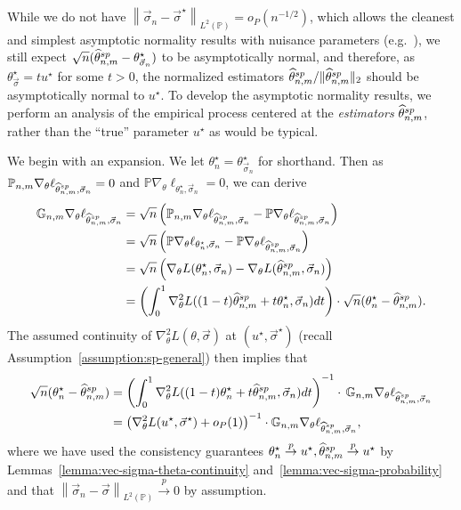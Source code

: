 \documentclass[11pt]{article}
\newcommand{\Prb}{\mathbb{P}}
\renewcommand{\P}{\mathbb{P}}
\newcommand{\prn}[1]{\left({#1}\right)} %
\newcommand{\norm}[1]{\left\|{#1}\right\|} %
\newcommand{\what}[1]{\widehat{#1}}
\newcommand{\sem}{^{\textup{sp}}}
\newcommand{\loss}{\ell}
\newcommand{\poploss}{L}
\newcommand{\norms}[1]{\|{#1}\|} %
\newcommand{\ltwos}[1]{\norms{#1}_2} %
\newcommand{\<}{\langle} %
\renewcommand{\>}{\rangle}
\newcommand{\cp}{\stackrel{p}{\rightarrow}}
\newcommand{\LtwoP}[1]{\norm{#1}_{L^2(\Prb)}}
\newcommand{\opt}{^\star}
\newcommand{\spe}{\what{\theta}\sem_{n,m}} %
\newcommand{\G}{\mathbb{G}}
\begin{document}
While we do not have $\LtwoP{\vec{\sigma}_n - \vec{\sigma}\opt} =
o_P(n^{-1/2})$, which allows the cleanest and simplest asymptotic normality
results with nuisance parameters
(e.g.~\cite[Thm.~25.54]{VanDerVaart98}), we still expect
$\sqrt{n}(\spe - \theta\opt_{\vec{\sigma}_n})$ to be asymptotically
normal, and therefore, as $\theta\opt_{\vec{\sigma}} = t u\opt$ for some
$t > 0$, the normalized estimators $\spe / \ltwos{\spe}$
should be asymptotically normal to $u\opt$.
To develop the asymptotic normality results, we perform an analysis
of the empirical process centered at the \emph{estimators}
$\spe$, rather than the ``true'' parameter $u\opt$ as would
be typical.

We begin with an expansion. We let $\theta\opt_n =
\theta\opt_{\vec{\sigma}_n}$ for shorthand.
Then as $\P_{n,m} \nabla_\theta \ell_{\spe,
	\vec{\sigma}_n} = 0$ and $\P \nabla_\theta \ell_{\theta\opt_n,
	\vec{\sigma}_n} = 0$, we can derive
\begin{align*}
	\G_{n,m} \nabla_\theta\ell_{\spe, \vec{\sigma}_n} & = \sqrt{n} \prn{\P_{n,m} \nabla_\theta \ell_{\spe, \vec{\sigma}_n} - \P \nabla_\theta \ell_{\spe, \vec{\sigma}_n}} \nonumber \\
	& = \sqrt{n} \prn{\P \nabla_\theta\ell_{\theta\opt_n, \vec{\sigma}_n} - \P \nabla_\theta\ell_{\spe, \vec{\sigma}_n}} \nonumber \\
	& = \sqrt{n} \prn{\nabla_\theta \poploss(\theta\opt_n, \vec{\sigma}_n) - \nabla_\theta \poploss (\spe, \vec{\sigma}_n) } \nonumber \\
	& = \prn{\int_0^1 \nabla_{\theta}^2 \poploss((1-t) \spe + t \theta\opt_n , \vec{\sigma}_n ) d t} \cdot \sqrt{n}(\theta\opt_n - \spe).
\end{align*}
The assumed continuity of $\nabla_\theta^2 \poploss(\theta, \vec{\sigma})$
at $(u\opt, \vec{\sigma}\opt)$ (recall
Assumption~\ref{assumption:sp-general}) then implies that
\begin{align}
	\sqrt{n}(\theta\opt_n - \spe)
	& = \prn{\int_0^1 \nabla_{\theta}^2 \poploss((1-t) \theta\opt_n + t \spe, \vec{\sigma}_n ) d t}^{-1}
	\cdot\, \G_{n,m} \nabla_\theta\loss_{\spe, \vec{\sigma}_n} \nonumber \\
	& =
	\prn{\nabla_\theta^2 \poploss(u\opt, \vec{\sigma}\opt)  + o_P(1)}^{-1}
	\cdot \G_{n,m} \nabla_\theta \loss_{\spe, \vec{\sigma}_n},
	\label{eqn:sp-mle-mid-1}
\end{align}
where we have used the consistency guarantees $\theta\opt_n \cp u\opt, \spe
\cp u\opt$ by Lemmas~\ref{lemma:vec-sigma-theta-continuity}
and~\ref{lemma:vec-sigma-probability} and that $\LtwoP{\vec{\sigma}_n -
	\vec{\sigma}} \cp 0$ by assumption.
\end{document}
